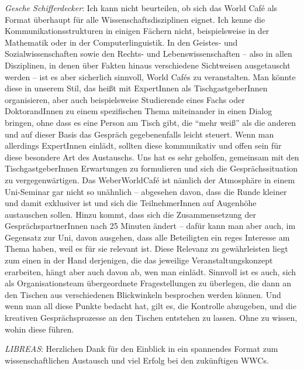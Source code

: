 \documentclass[a4paper,
fontsize=11pt,
oneside,
numbers=noperiodatend,
parskip=half-,
bibliography=totoc,
final
]{scrartcl}
\begin{document}
\emph{Gesche Schifferdecker}: Ich kann nicht beurteilen, ob sich das
World Café als Format überhaupt für alle Wissenschaftsdisziplinen
eignet. Ich kenne die Kommunikationsstrukturen in einigen Fächern nicht,
beispielsweise in der Mathematik oder in der Computerlinguistik. In den
Geistes- und Sozialwissenschaften sowie den Rechts- und
Lebenswissenschaften -- also in allen Disziplinen, in denen über Fakten
hinaus verschiedene Sichtweisen ausgetauscht werden -- ist es aber
sicherlich sinnvoll, World Cafés zu veranstalten. Man könnte diese in
unserem Stil, das heißt mit ExpertInnen als TischgastgeberInnen
organisieren, aber auch beispielsweise Studierende eines Fachs oder
DoktorandInnen zu einem spezifischen Thema miteinander in einen Dialog
bringen, ohne dass es eine Person am Tisch gibt, die \enquote{mehr weiß}
als die anderen und auf dieser Basis das Gespräch gegebenenfalls leicht
steuert. Wenn man allerdings ExpertInnen einlädt, sollten diese
kommunikativ und offen sein für diese besondere Art des Austauschs. Uns
hat es sehr geholfen, gemeinsam mit den TischgastgeberInnen Erwartungen
zu formulieren und sich die Gesprächssituation zu vergegenwärtigen. Das
WeberWorldCafé ist nämlich der Atmosphäre in einem Uni-Seminar gar nicht
so unähnlich -- abgesehen davon, dass die Runde kleiner und damit
exklusiver ist und sich die TeilnehmerInnen auf Augenhöhe austauschen
sollen. Hinzu kommt, dass sich die Zusammensetzung der
GesprächspartnerInnen nach 25 Minuten ändert -- dafür kann man aber
auch, im Gegensatz zur Uni, davon ausgehen, dass alle Beteiligten ein
reges Interesse am Thema haben, weil es für sie relevant ist. Diese
Relevanz zu gewährleisten liegt zum einen in der Hand derjenigen, die
das jeweilige Veranstaltungskonzept erarbeiten, hängt aber auch davon
ab, wen man einlädt. Sinnvoll ist es auch, sich als Organisationsteam
übergeordnete Fragestellungen zu überlegen, die dann an den Tischen aus
verschiedenen Blickwinkeln besprochen werden können. Und wenn man all
diese Punkte bedacht hat, gilt es, die Kontrolle abzugeben, und die
kreativen Gesprächsprozesse an den Tischen entstehen zu lassen. Ohne zu
wissen, wohin diese führen.

\emph{LIBREAS}: Herzlichen Dank für den Einblick in ein spannendes
Format zum wissenschaftlichen Austausch und viel Erfolg bei den
zukünftigen WWCs.

\end{document}
